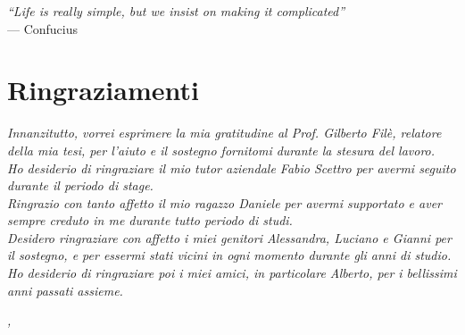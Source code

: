 
\cleardoublepage
{}
{}

\begin{flushright}{
	\slshape    
	``Life is really simple, but we insist on making it complicated''} \\ 
	\medskip
    --- Confucius
\end{flushright}


\bigskip

\begingroup
\let\clearpage\relax
\let\cleardoublepage\relax
\let\cleardoublepage\relax

\chapter*{Ringraziamenti}

\noindent \textit{Innanzitutto, vorrei esprimere la mia gratitudine al Prof. Gilberto Filè, relatore della mia tesi, per l'aiuto e il sostegno fornitomi durante la stesura del lavoro.}\\

\noindent \textit{Ho desiderio di ringraziare il mio tutor aziendale Fabio Scettro per avermi seguito durante il periodo di stage.}\\

\noindent \textit{Ringrazio con tanto affetto il mio ragazzo Daniele per avermi supportato e aver sempre creduto in me durante tutto periodo di studi.}\\

\noindent \textit{Desidero ringraziare con affetto i miei genitori Alessandra, Luciano e Gianni per il sostegno, e per essermi stati vicini in ogni momento durante gli anni di studio.}\\

\noindent \textit{Ho desiderio di ringraziare poi i miei amici, in particolare Alberto, per i bellissimi anni passati assieme.}\\
\bigskip

\noindent\textit{\myLocation, \myTime}
\hfill \myName

\endgroup

